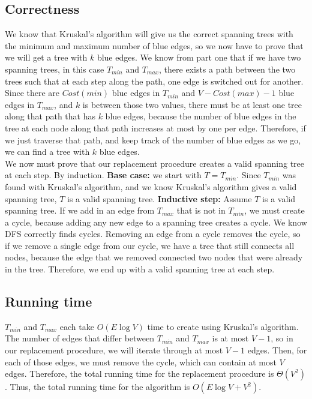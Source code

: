 \documentclass[12pt]{article}
\begin{document}
\subsection*{Correctness}
We know that Kruskal's algorithm will give us the correct spanning trees with the minimum and maximum number of blue edges, so we now have to prove that we will get a tree with $k$ blue edges. We know from part one that if we have two spanning trees, in this case $T_{min}$ and $T_{max}$, there exists a path between the two trees such that at each step along the path, one edge is switched out for another. Since there are $Cost(min)$ blue edges in $T_{min}$ and $V-Cost(max)-1$ blue edges in $T_{max}$, and $k$ is between those two values, there must be at least one tree along that path that has $k$ blue edges, because the number of blue edges in the tree at each node along that path increases at most by one per edge. Therefore, if we just traverse that path, and keep track of the number of blue edges as we go, we can find a tree with $k$ blue edges.\\
We now must prove that our replacement procedure creates a valid spanning tree at each step. By induction. \textbf{Base case:} we start with $T = T_{min}$. Since $T_{min}$ was found with Kruskal's algorithm, and we know Kruskal's algorithm gives a valid spanning tree, $T$ is a valid spanning tree. \textbf{Inductive step:} Assume $T$ is a valid spanning tree. If we add in an edge from $T_{max}$ that is not in $T_{min}$, we must create a cycle, because adding any new edge to a spanning tree creates a cycle. We know DFS correctly finds cycles. Removing an edge from a cycle removes the cycle, so if we remove a single edge from our cycle, we have a tree that still connects all nodes, because the edge that we removed connected two nodes that were already in the tree. Therefore, we end up with a valid spanning tree at each step.

\subsection*{Running time}
$T_{min}$ and $T_{max}$ each take $O(E \log V)$ time to create using Kruskal's algorithm. The number of edges that differ between $T_{min}$ and $T_{max}$ is at most $V-1$, so in our replacement procedure, we will iterate through at most $V-1$ edges. Then, for each of those edges, we must remove the cycle, which can contain at most $V$ edges. Therefore, the total running time for the replacement procedure is $\Theta(V^2)$. Thus, the total running time for the algorithm is $O(E \log V + V^2)$.
\end{document}
